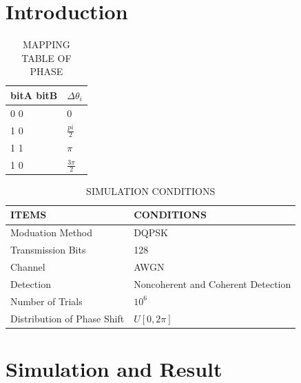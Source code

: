 \documentclass[technicalreport]{ieicej}
\begin{document}
\begin{eabstract}

\end{eabstract}

\maketitle

\section{Introduction}


\begin{table}[tbp]
	\begin{center}
	\caption{MAPPING TABLE OF PHASE}
	\begin{tabular}{ll}
	\hline
	\textbf{bitA bitB} & \textbf{$\Delta\theta_{i}$} \\
	\hline
	0 0 & $0$ \\
	1 0 & $\frac{pi}{2}$ \\
	1 1 & $\pi$ \\
	1 0 & $\frac{3\pi}{2}$ \\
	\hline
	\end{tabular}
	\end{center}
\end{table}

\begin{table}[hb]
	\begin{center}
	\caption{SIMULATION CONDITIONS}
	\label{tbl:simu}
	\small
	\begin{tabular}{ll}
	\hline
	ITEMS & CONDITIONS\\
	\hline
	Moduation Method & DQPSK \\
	Transmission Bits & 128 \\
	Channel & AWGN \\
	Detection & Noncoherent and Coherent Detection \\
	Number of Trials & $10^{6}$\\
	Distribution of Phase Shift & $U[0,2\pi]$\\
	\hline
	\end{tabular}
	\end{center}
\end{table}

\section{Simulation and Result}
\end{document}
